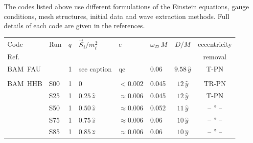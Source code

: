 The codes listed above use different formulations of the Einstein
equations, gauge conditions, mesh structures, initial data and wave
extraction methods.  Full details of each code are given in the
references.


\begin{table}
\begin{center}
\begin{tabular}{|l|l|l|l|l|l|c|c|}\hline
Code & Run & $q$ & $\vec S_i/m_i^2$ & $e$ & $\omega_{22}\, M$ & $D/M$ &
eccentricity
\\ 
\hfill Ref.     &     &   &                        &   &          &       &
     removal \\ \hline

BAM~FAU      & \cite{Tichy:2008du}       & 1 & 
see caption
& qc  & 0.06 & $9.58\,\hat y$ & T-PN \cite{Marronetti:2007ya,Marronetti:2007wz} \\
\hfill\cite{Brugmann:2008zz,Husa:2007hp}              &        &   &
&    &      & &   \\[1em]

BAM~HHB      & S00 \cite{Hannam:2007ik}   & 1 & $0$       & $< 0.002$   &
0.045 & $12\,\hat y$ & TR-PN \cite{Husa:2007rh} \\ 
\hfill\cite{Brugmann:2008zz,Husa:2007hp}              & S25 \cite{Hannam:2007wf}   & 1 & $0.25\,\hat z$    & $\approx 0.006$  &
              0.045 & $12\,\hat y$ & T-PN \cite{Brugmann:2007zj} \\
              & S50 \cite{Hannam:2007wf}   & 1 & $0.50\,\hat z$    & $\approx 0.006$  &
              0.052 & $11\,\hat y$ & -- '' -- \\ %
              & S75 \cite{Hannam:2007wf}   & 1 & $0.75\,\hat z$    & $\approx 0.006$ &
              0.06 &  $10\,\hat y$ & -- '' -- \\ %
              & S85 \cite{Hannam:2007wf}   & 1 & $0.85\,\hat z$    & $\approx 0.006$  &
              0.06 &  $10\,\hat y$ & -- '' -- \\[1em] %



\end{tabular}
\end{center}
\end{table}
